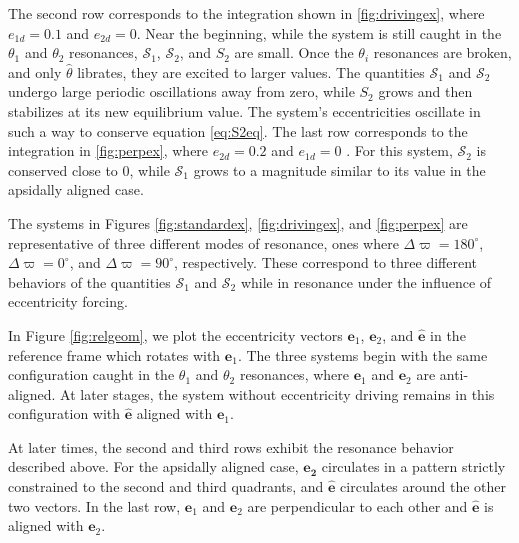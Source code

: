 \documentclass[usenatbib]{mnras}
\begin{document}
The second row corresponds to the integration shown in
\ref{fig:drivingex}, where \(e_{1d}=0.1\) and \(e_{2d}=0\).  Near the
beginning, while the system is still caught in the \(\theta_1\) and
\(\theta_2\) resonances, \(\mathcal{S}_1\), \(\mathcal{S}_2\), and \(S_2\) are
small.  Once the \(\theta_i\) resonances are broken, and only
\(\hat\theta\) librates, they are excited to larger values.  The
quantities \(\mathcal{S}_1\) and \(\mathcal{S}_2\) undergo large periodic
oscillations away from zero, while \(S_2\) grows and then stabilizes at
its new equilibrium value. The system's eccentricities oscillate in
such a way to conserve equation \eqref{eq:S2eq}.  The last row
corresponds to the integration in \ref{fig:perpex}, where \(e_{2d}=0.2\)
and \(e_{1d}=0\) .  For this system, \(\mathcal{S}_2\) is conserved close
to 0, while \(\mathcal{S}_1\) grows to a magnitude similar to its value
in the apsidally aligned case.

The systems in Figures \ref{fig:standardex}, \ref{fig:drivingex}, and
\ref{fig:perpex} are representative of three different modes of
resonance, ones where \(\Delta\varpi=180^\circ\),
\(\Delta\varpi=0^\circ\), and \(\Delta\varpi=90^\circ\),
respectively. These correspond to three different behaviors of the
quantities \(\mathcal{S}_1\) and \(\mathcal{S}_2\) while in resonance
under the influence of eccentricity forcing.

In Figure \ref{fig:relgeom}, we plot the eccentricity
vectors \(\mathbf{e}_{1}\), \(\mathbf{e}_{2}\), and \(\mathbf{\hat e}\)
in the reference frame which rotates with \(\mathbf{e}_1\).
The three systems begin with the same configuration
caught in the \(\theta_1\) and \(\theta_2\) resonances,
where \(\mathbf{e}_1\) and \(\mathbf{e}_2\) are anti-aligned.
At later stages, the system without eccentricity driving
remains in this configuration with \(\mathbf{\hat e}\)
aligned with \(\mathbf{e}_1\).

At later times, the second and third rows exhibit the
resonance behavior described above.  For the apsidally aligned case,
\(\mathbf{e_2}\) circulates in a pattern strictly constrained to the
second and third quadrants, and \(\mathbf{\hat e}\) circulates around the
other two vectors.  In the last row, \(\mathbf{e}_1\) and \(\mathbf{e}_2\)
are perpendicular to each other and \(\mathbf{\hat e}\) is aligned with
\(\mathbf{e}_2\).
\end{document}

